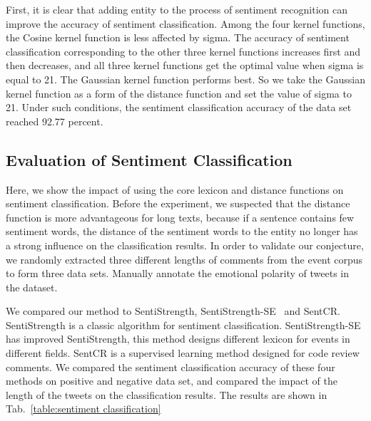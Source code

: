 \documentclass[runningheads]{llncs}
\begin{document}
First, it is clear that adding entity to the process of sentiment recognition can improve the accuracy of sentiment classification. Among the four kernel functions, the Cosine kernel function is less affected by sigma. The accuracy of sentiment classification corresponding to the other three kernel functions increases first and then decreases, and all three kernel functions get the optimal value when sigma is equal to 21. The Gaussian kernel function performs best. So we take the Gaussian kernel function as a form of the distance function and set the value of sigma to 21. Under such conditions, the sentiment classification accuracy of the data set reached 92.77 percent.
\subsection{Evaluation of Sentiment Classification}
Here, we show the impact of using the core lexicon and distance functions on sentiment classification. Before the experiment, we suspected that the distance function is more advantageous for long texts, because if a sentence contains few sentiment words, the distance of the sentiment words to the entity no longer has a strong influence on the classification results. In order to validate our conjecture, we randomly extracted three different lengths of comments from the event corpus to form three data sets. Manually annotate the emotional polarity of tweets in the dataset.

We compared our method to SentiStrength, SentiStrength-SE~\cite{Rakibul2017SentiStrength-SE} and SentCR. SentiStrength is a classic algorithm for sentiment classification. SentiStrength-SE has improved SentiStrength, this method designs different lexicon for events in different fields. SentCR is a supervised learning method designed for code review comments. We compared the sentiment classification accuracy of these four methods on positive and negative data set, and compared the impact of the length of the tweets on the classification results. The results are shown in Tab.~\ref{table:sentiment classification}
\end{document}
